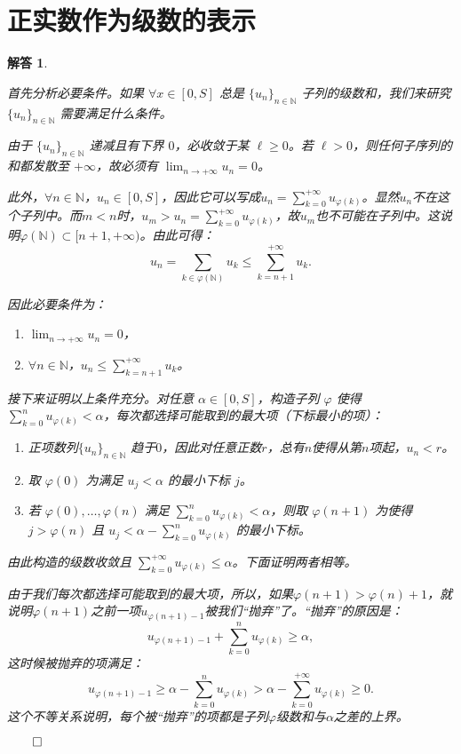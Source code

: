 \documentclass[12pt,UTF8]{ctexbook}
\theoremstyle{exercisestyle}
\theoremstyle{solutionstyle}
\newtheorem*{solution*}{解答}
\newenvironment{solution}
  {\begin{solution*}}
  {\hfill\ensuremath{\qed}\end{solution*}}
\begin{document}
\section{正实数作为级数的表示}
\begin{solution}
\begin{subquestions}
\item 首先分析必要条件。如果 $\forall x \in [0, S]$ 总是 $\{u_n\}_{n\in\mathbb{N}}$ 子列的级数和，我们来研究 $\{u_n\}_{n\in\mathbb{N}}$ 需要满足什么条件。

由于 $\{u_n\}_{n\in\mathbb{N}}$ 递减且有下界 $0$，必收敛于某 $\ell \geqslant 0$。若 $\ell > 0$，则任何子序列的和都发散至 $+\infty$，故必须有 $\displaystyle \lim_{n \to +\infty} u_n = 0$。

此外，$\forall n \in \mathbb{N}$，$u_n\in [0, S]$，因此它可以写成$\displaystyle u_n = \sum_{k=0}^{+\infty} u_{\varphi(k)}$。显然$u_n$不在这个子列中。而$m < n$时，$\displaystyle u_m > u_n = \sum_{k=0}^{+\infty} u_{\varphi(k)}$，故$u_m$也不可能在子列中。这说明$\varphi(\mathbb{N}) \subset [n+1, +\infty)$。由此可得：
$$
u_n = \sum_{k\in\varphi(\mathbb{N})} u_k \leqslant \sum_{k=n+1}^{+\infty} u_k.
$$

因此必要条件为：
\begin{enumerate}[label=\arabic*.]
    \item $\displaystyle\lim_{n \to +\infty} u_n = 0$，
    \item $\forall n \in \mathbb{N}$，$\displaystyle u_n \leq \sum_{k=n+1}^{+\infty} u_k$。
\end{enumerate}

接下来证明以上条件充分。对任意 $\alpha \in [0, S]$，构造子列 $\varphi$ 使得 $\displaystyle\sum_{k=0}^n u_{\varphi(k)} < \alpha$，每次都选择可能取到的最大项（下标最小的项）：
\begin{enumerate}[label=\arabic*.]
\item 正项数列$\{u_n\}_{n\in\mathbb{N}}$ 趋于$0$，因此对任意正数$r$，总有$n$使得从第$n$项起，$u_n < r$。
\item 取 $\varphi(0)$ 为满足 $u_j < \alpha$ 的最小下标 $j$。
\item 若 $\varphi(0),\dots,\varphi(n)$ 满足 $\sum_{k=0}^n u_{\varphi(k)} < \alpha$，则取 $\varphi(n+1)$ 为使得 $j > \varphi(n)$ 且 $u_j < \alpha - \sum_{k=0}^n u_{\varphi(k)}$ 的最小下标。
\end{enumerate}

由此构造的级数收敛且 $\displaystyle \sum_{k=0}^{+\infty} u_{\varphi(k)} \leq \alpha$。下面证明两者相等。

由于我们每次都选择可能取到的最大项，所以，如果$\varphi(n+1) > \varphi(n)+1$，就说明$\varphi(n+1)$之前一项$u_{\varphi(n+1)-1}$被我们“抛弃”了。“抛弃”的原因是：
$$  u_{\varphi(n+1)-1} + \sum_{k=0}^n u_{\varphi(k)} \geqslant \alpha, $$
这时候被抛弃的项满足：
$$
u_{\varphi(n+1)-1} \geqslant \alpha - \sum_{k=0}^n u_{\varphi(k)} > \alpha - \sum_{k=0}^{+\infty} u_{\varphi(k)} \geqslant 0.
$$
这个不等关系说明，每个被“抛弃”的项都是子列$\varphi$级数和与$\alpha$之差的上界。


\end{subquestions}
\end{solution}
\end{document}
